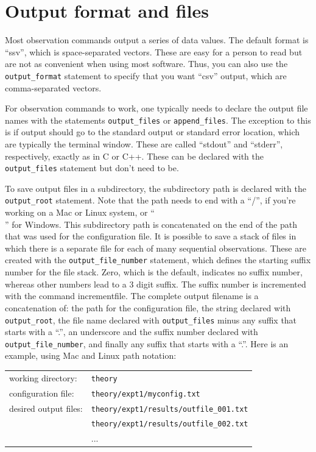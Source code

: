 \documentclass {scrbook}
\newcommand {\ttt} {\texttt}
\begin{document}
\section{Output format and files}

Most observation commands output a series of data values. The default format is ``ssv'', which is space-separated vectors. These are easy for a person to read but are not as convenient when using most software. Thus, you can also use the \ttt{output\_format} statement to specify that you want ``csv'' output, which are comma-separated vectors.

For observation commands to work, one typically needs to declare the output file names with the statements \ttt{output\_files} or \ttt{append\_files}. The exception to this is if output should go to the standard output or standard error location, which are typically the terminal window. These are called ``stdout'' and ``stderr'', respectively, exactly as in C or C++. These can be declared with the \ttt{output\_files} statement but don't need to be.

To save output files in a subdirectory, the subdirectory path is declared with the \ttt{output\_root} statement. Note that the path needs to end with a ``/'', if you're working on a Mac or Linux system, or ``\\'' for Windows. This subdirectory path is concatenated on the end of the path that was used for the configuration file. It is possible to save a stack of files in which there is a separate file for each of many sequential observations. These are created with the \ttt{output\_file\_number} statement, which defines the starting suffix number for the file stack. Zero, which is the default, indicates no suffix number, whereas other numbers lead to a 3 digit suffix. The suffix number is incremented with the command incrementfile. The complete output filename is a concatenation of: the path for the configuration file, the string declared with \ttt{output\_root}, the file name declared with \ttt{output\_files} minus any suffix that starts with a ``.'', an underscore and the suffix number declared with \ttt{output\_file\_number}, and finally any suffix that starts with a ``.''. Here is an example, using Mac and Linux path notation:

\begin{longtable}[c]{ll}
working directory: & \ttt{theory}\\
configuration file: & \ttt{theory/expt1/myconfig.txt}\\
desired output files: & \ttt{theory/expt1/results/outfile\_001.txt}\\
 & \ttt{theory/expt1/results/outfile\_002.txt}\\
 & ...
\end{longtable}
\end{document}
